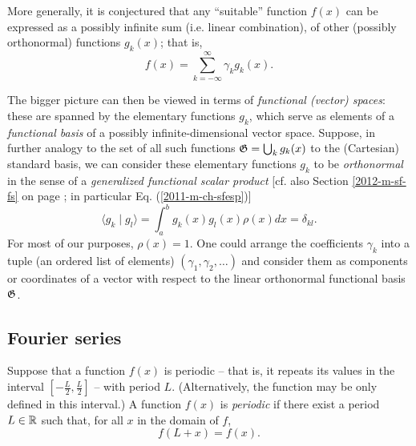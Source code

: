 More generally, it is conjectured that any ``suitable''
function $f(x)$
can be expressed as a  possibly infinite  sum (i.e. linear combination), of other (possibly orthonormal) functions $g_k( x)$; that is,
\begin{equation}
f(x)= \sum_{k=-\infty}^\infty
\gamma_k g_k(x).
\label{2012-m-ch-fourier_conjecturegen}
\end{equation}

The bigger picture can then be viewed in terms of
{\em functional (vector) spaces}: these are spanned by the elementary functions $g_k$, which serve as elements of a
{\em functional basis} of a possibly infinite-dimensional vector space.
Suppose, in further analogy to the set of all such functions ${\frak G}=\bigcup_k g_k(x)$
to the (Cartesian) standard basis, we can consider these elementary functions $g_k$ to be
{\em orthonormal} in the sense of a {\em generalized functional scalar product}
 [cf. also Section \ref{2012-m-sf-fs} on page \pageref{2012-m-sf-fs}; in particular
Eq. (\ref{2011-m-ch-sfesp})]
\begin{equation}
\langle   g_k \mid g_l\rangle
=
\int_{a}^b g_k(x)g_l(x)  \rho(x) dx =\delta_{kl}.
\label{2012-m-ch-sfesp1}
\end{equation}
For most of our purposes, $\rho (x)=1$.
One could arrange the coefficients $\gamma_k$ into a tuple (an ordered list of elements)
$(\gamma_1,\gamma_2, \ldots)$
and consider them as components or coordinates of a vector with respect to the
linear orthonormal functional basis ${\frak G}$.



\subsection{Fourier series}

Suppose that a function $f(x)$ is periodic -- that is, it repeats  its values in the interval $[-\frac{L}{2},\frac{L}{2}]$ --  with period $L$.
(Alternatively, the function may be only defined in this interval.)
A function $f(x)$
is {\em periodic}
if there exist a period $L\in {\Bbb R}$ such that, for all $x$ in the domain of $f$,
\begin{equation}
f(L+x)=f(x).
\end{equation}


